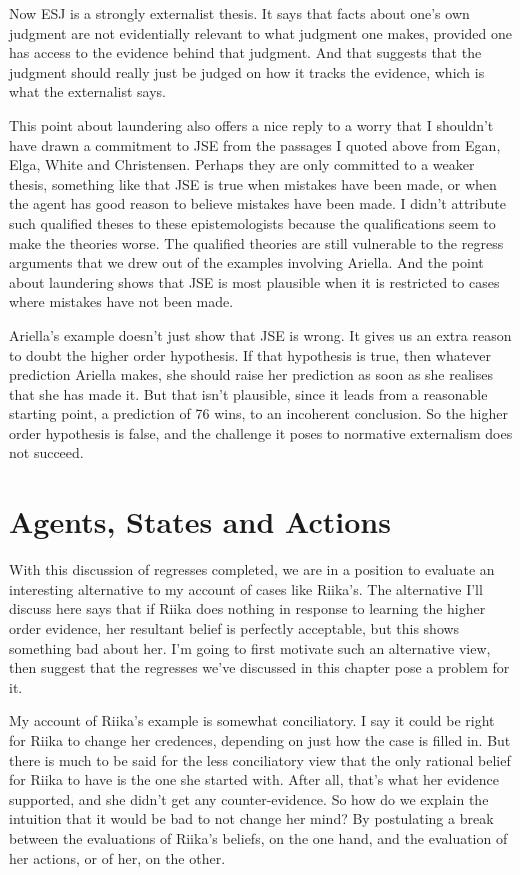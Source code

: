 Now ESJ is a strongly externalist thesis. It says that facts about one's own judgment are not evidentially relevant to what judgment one makes, provided one has access to the evidence behind that judgment. And that suggests that the judgment should really just be judged on how it tracks the evidence, which is what the externalist says.

This point about laundering also offers a nice reply to a worry that I shouldn't have drawn a commitment to JSE from the passages I quoted above from Egan, Elga, White and Christensen. Perhaps they are only committed to a weaker thesis, something like that JSE is true when mistakes have been made, or when the agent has good reason to believe mistakes have been made. I didn't attribute such qualified theses to these epistemologists because the qualifications seem to make the theories worse. The qualified theories are still vulnerable to the regress arguments that we drew out of the examples involving \gls{Ariella}. And the point about laundering shows that JSE is most plausible when it is restricted to cases where mistakes have not been made.

\gls{Ariella}'s example doesn't just show that JSE is wrong. It gives us an extra reason to doubt the higher order hypothesis. If that hypothesis is true, then whatever prediction \gls{Ariella} makes, she should raise her prediction as soon as she realises that she has made it. But that isn't plausible, since it leads from a reasonable starting point, a prediction of 76 wins, to an incoherent conclusion. So the higher order hypothesis is false, and the challenge it poses to normative externalism does not succeed.

\section{Agents, States and Actions}
\label{agentsstatesandactions}

With this discussion of regresses completed, we are in a position to evaluate an interesting alternative to my account of cases like \gls{Riika}'s. The alternative I'll discuss here says that if \gls{Riika} does nothing in response to learning the higher order evidence, her resultant belief is perfectly acceptable, but this shows something bad about her. I'm going to first motivate such an alternative view, then suggest that the regresses we've discussed in this chapter pose a problem for it.

My account of \gls{Riika}'s example is somewhat conciliatory. I say it could be right for \gls{Riika} to change her credences, depending on just how the case is filled in. But there is much to be said for the less conciliatory view that the only rational belief for \gls{Riika} to have is the one she started with. After all, that's what her evidence supported, and she didn't get any counter-evidence. So how do we explain the intuition that it would be bad to not change her mind? By postulating a break between the evaluations of \gls{Riika}'s beliefs, on the one hand, and the evaluation of her actions, or of her, on the other.

